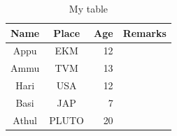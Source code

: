 \documentclass[11pt]{beamer}
\begin{document}
\begin{frame}
	\begin{table}[h]
		\begin{center}
			\begin{tabular}{|c|c|r|c|}
				\hline
				\rule[-1ex]{0pt}{2.5ex} Name & Place & Age & Remarks \\
				\hline
				\rule[-1ex]{0pt}{2.5ex} Appu & EKM & 12 &  \\
				\hline
				\rule[-1ex]{0pt}{2.5ex} Ammu & TVM & 13 &  \\
				\hline
				\rule[-1ex]{0pt}{2.5ex} Hari & USA &12  &  \\
				\hline
				\rule[-1ex]{0pt}{2.5ex} Basi & JAP  & 7 &  \\
				\hline
				\rule[-1ex]{0pt}{2.5ex} Athul & PLUTO & 20 &  \\
				\hline
			\end{tabular}
		\end{center}
		\caption{My table}
		\label{tab:1}
	\end{table}
\end{frame}
\end{document}
